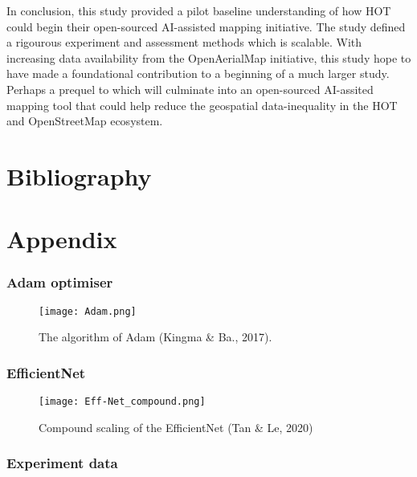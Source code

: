 \documentclass[11pt, a4paper, twoside]{report}
\begin{document}
In conclusion, this study provided a pilot baseline understanding of how HOT could begin their open-sourced AI-assisted mapping initiative. The study defined a rigourous experiment and assessment methods which is scalable. With increasing data availability from the OpenAerialMap initiative, this study hope to have made a foundational contribution to a beginning of a much larger study. Perhaps a prequel to which will culminate into an open-sourced AI-assited mapping tool that could help reduce the geospatial data-inequality in the HOT and OpenStreetMap ecosystem.\\\par

\newpage

\chapter{Bibliography}\label{Bib}

\newpage

\chapter{Appendix}\label{Appen}

\subsection{Adam optimiser}\label{Adam}

\begin{figure}[H]
  \centering
  \texttt{[image: Adam.png]}
  \caption{The algorithm of Adam (Kingma \& Ba., 2017).}
  \label{app:Adam}
\end{figure}

\subsection{EfficientNet}\label{Eff-Net}

\begin{figure}[H]
  \centering
  \texttt{[image: Eff-Net\_compound.png]}
  \caption{Compound scaling of the EfficientNet (Tan \& Le, 2020)}
  \label{app:EfficientNet}
\end{figure}

\newpage

\subsection{Experiment data}\label{fulldata}
\end{document}
